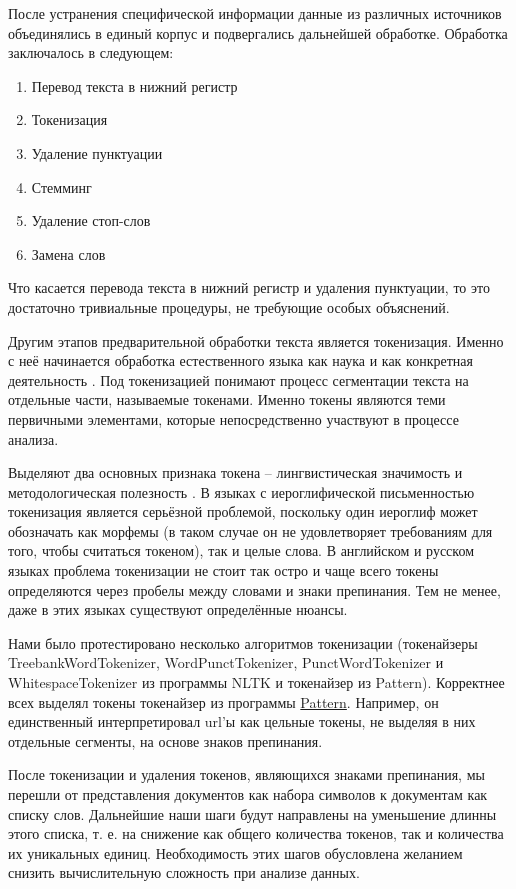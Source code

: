После устранения специфической информации данные из различных источников объединялись в единый корпус и подвергались дальнейшей обработке. Обработка заключалось в следующем:
\begin{enumerate}
\item Перевод текста в нижний регистр
\item Токенизация %
\item Удаление пунктуации
\item Стемминг
\item Удаление стоп-слов
\item Замена слов
\end{enumerate}

Что касается перевода текста в нижний регистр и удаления пунктуации, то это достаточно тривиальные процедуры, не требующие особых объяснений.

Другим этапов предварительной обработки текста является токенизация. Именно с неё начинается обработка естественного языка как наука и как конкретная деятельность \cite{Webster1992}. Под токенизацией понимают процесс сегментации текста на отдельные части, называемые токенами. Именно токены являются теми первичными элементами, которые непосредственно участвуют в процессе анализа. 

Выделяют два основных признака токена -- лингвистическая значимость и методологическая полезность \cite[стр. 1106]{Webster1992}. В языках с иероглифической письменностью токенизация является серьёзной проблемой, поскольку один иероглиф может обозначать как морфемы (в таком случае он не удовлетворяет требованиям для того, чтобы считаться токеном), так и целые слова. В английском и русском языках проблема токенизации не стоит так остро и чаще всего токены определяются через пробелы между словами и знаки препинания. Тем не менее, даже в этих языках существуют определённые нюансы.

Нами было протестировано несколько алгоритмов токенизации (токенайзеры TreebankWordTokenizer, WordPunctTokenizer, PunctWordTokenizer и WhitespaceTokenizer из программы NLTK и токенайзер из Pattern). Корректнее всех выделял токены токенайзер из программы \href{http://www.clips.ua.ac.be/pattern}{Pattern}. Например, он единственный интерпретировал url'ы как цельные токены, не выделяя в них отдельные сегменты, на основе знаков препинания.

После токенизации и удаления токенов, являющихся знаками препинания, мы перешли от представления документов как набора символов к документам как списку слов. Дальнейшие наши шаги будут направлены на уменьшение длинны этого списка, т. е. на снижение как общего количества токенов, так и количества их уникальных единиц. Необходимость этих шагов обусловлена желанием снизить вычислительную сложность при анализе данных.

